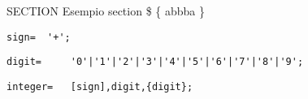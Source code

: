 \documentclass{article}
\begin{document}
    SECTION Esempio section \$ \{ abbba \} 
    \begin{lstlisting}[mathescape=true]
     sign= 	'+';
    \end{lstlisting}
    
    \begin{lstlisting}[mathescape=true]
     digit= 	'0'|'1'|'2'|'3'|'4'|'5'|'6'|'7'|'8'|'9';
    \end{lstlisting}
    
    \begin{lstlisting}[mathescape=true]
     integer= 	[sign],digit,{digit};
    \end{lstlisting}
    
\end{document}
